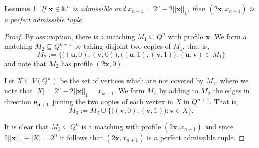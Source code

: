 \documentclass{article}
\newtheorem{lemma}[theorem]{Lemma}
\begin{document}
\begin{lemma}\label{l:admissible}
If $\bm{x} \in \mathbb{N}^{n}$ is admissible and $x_{n+1} = 2^{n} - 2||\bm{x}||_1$, then $(2\bm{x},x_{n+1})$ is a perfect admissible tuple.
\end{lemma}

\begin{proof}
By assumption, there is a matching $M_1 \subseteq Q^{n}$ with profile $\bm{x}$. We form a matching $M_2 \subseteq Q^{n+1}$ by taking disjoint two copies of $M_1$, that is,
\[
M_2 := \{\big((\bm{u},0),(\bm{v},0)\big), \big((\bm{u},1),(\bm{v},1)\big) \colon (\bm{u},\bm{v}) \in M_1 \}
\]
and note that $M_2$ has profile $
(2\bm{x},0)$.

Let $X \subseteq V\left(Q^{n}\right)$ be the set of vertices which are not covered by $M_1$, where we note that $|X| = 2^{n} - 2||\bm{x}||_1 = x_{n+1}$. We form $M_3$ by adding to $M_2$ the edges in direction $\bm{e_{n+1}}$ joining the two copies of each vertex in $X$ in $Q^{n+1}$. That is, 
\[
M_3 := M_2 \cup \{ \big((\bm{v},0), (\bm{v},1) \big) \colon \bm{v} \in X \}.
\]

It is clear that $M_3 \subseteq Q^n$ is a matching with profile $(2\bm{x}, x_{n+1})$ and since $2||\bm{x}||_1 + |X| = 2^{n}$ it follows that $(2\bm{x}, x_{n+1})$ is a  perfect admissible tuple.
\end{proof}
\end{document}
